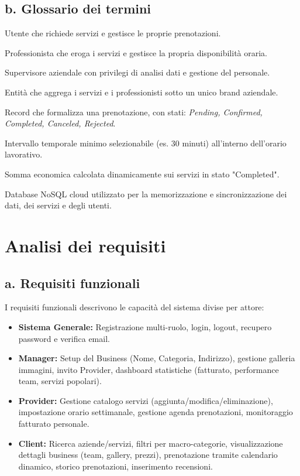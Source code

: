 \documentclass[12pt]{article}
\begin{document}
\subsection{b. Glossario dei termini}
\begin{description}[noitemsep]
    \item[Client] Utente che richiede servizi e gestisce le proprie prenotazioni.
    \item[Provider] Professionista che eroga i servizi e gestisce la propria disponibilità oraria.
    \item[Manager] Supervisore aziendale con privilegi di analisi dati e gestione del personale.
    \item[Business] Entità che aggrega i servizi e i professionisti sotto un unico brand aziendale.
    \item[Booking] Record che formalizza una prenotazione, con stati: \textit{Pending, Confirmed, Completed, Canceled, Rejected}.
    \item[Slot] Intervallo temporale minimo selezionabile (es. 30 minuti) all'interno dell'orario lavorativo.
    \item[Turnover (Fatturato)] Somma economica calcolata dinamicamente sui servizi in stato "Completed".
    \item[Firestore] Database NoSQL cloud utilizzato per la memorizzazione e sincronizzazione dei dati, dei servizi e degli utenti.
\end{description}

\newpage
\section{Analisi dei requisiti}
\subsection{a. Requisiti funzionali}
I requisiti funzionali descrivono le capacità del sistema divise per attore:
\begin{itemize}
    \item \textbf{Sistema Generale:} Registrazione multi-ruolo, login, logout, recupero password e verifica email.
    \item \textbf{Manager:} Setup del Business (Nome, Categoria, Indirizzo), gestione galleria immagini, invito Provider, dashboard statistiche (fatturato, performance team, servizi popolari).
    \item \textbf{Provider:} Gestione catalogo servizi (aggiunta/modifica/eliminazione), impostazione orario settimanale, gestione agenda prenotazioni, monitoraggio fatturato personale.
    \item \textbf{Client:} Ricerca aziende/servizi, filtri per macro-categorie, visualizzazione dettagli business (team, gallery, prezzi), prenotazione tramite calendario dinamico, storico prenotazioni, inserimento recensioni.
\end{itemize}
\end{document}
